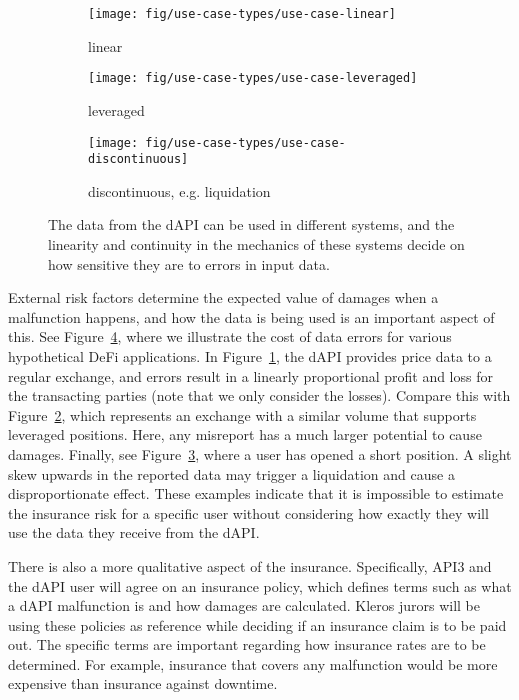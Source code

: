 \documentclass[11pt]{article}
\begin{document}
\begin{figure}[!t]
     \centering
     \begin{subfigure}{0.38\textwidth}
         \centering
         \texttt{[image: fig/use-case-types/use-case-linear]}
         \caption{linear}
         \label{fig:use-case-linear}
     \end{subfigure}
     
     \begin{subfigure}{0.38\textwidth}
         \centering
         \texttt{[image: fig/use-case-types/use-case-leveraged]}
         \caption{leveraged}
         \label{fig:use-case-leveraged}
     \end{subfigure}
     \begin{subfigure}{0.38\textwidth}
         \centering
         \texttt{[image: fig/use-case-types/use-case-discontinuous]}
         \caption{discontinuous, e.g. liquidation}
         \label{fig:use-case-discontinuous}
     \end{subfigure}
    \caption{The data from the dAPI can be used in different systems, and the linearity and continuity in the mechanics of these systems decide on how sensitive they are to errors in input data.}
    \label{fig:use-case-types}
\end{figure}

External risk factors determine the expected value of damages when a malfunction happens, and how the data is being used is an important aspect of this.
See Figure~\ref{fig:use-case-types}, where we illustrate the cost of data errors for various hypothetical DeFi applications.
In Figure~\ref{fig:use-case-linear}, the dAPI provides price data to a regular exchange, and errors result in a linearly proportional profit and loss for the transacting parties (note that we only consider the losses).
Compare this with Figure~\ref{fig:use-case-leveraged}, which represents an exchange with a similar volume that supports leveraged positions.
Here, any misreport has a much larger potential to cause damages.
Finally, see Figure~\ref{fig:use-case-discontinuous}, where a user has opened a short position.
A slight skew upwards in the reported data may trigger a liquidation and cause a disproportionate effect.
These examples indicate that it is impossible to estimate the insurance risk for a specific user without considering how exactly they will use the data they receive from the dAPI.

There is also a more qualitative aspect of the insurance.
Specifically, API3 and the dAPI user will agree on an insurance policy, which defines terms such as what a dAPI malfunction is and how damages are calculated.
Kleros jurors will be using these policies as reference while deciding if an insurance claim is to be paid out.
The specific terms are important regarding how insurance rates are to be determined.
For example, insurance that covers any malfunction would be more expensive than insurance against downtime.
\end{document}
